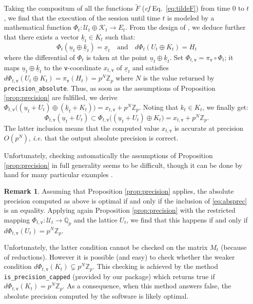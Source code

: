 \documentclass[sigconf]{acmart}
\newcommand{\Z}{\mathbb Z}
\newcommand{\Zp}{\Z_p}
\newcommand{\Q}{\mathbb Q}
\newcommand{\Qp}{\Q_p}
\newcommand{\ttv}{\texttt{v}\xspace}
\newcommand{\calU}{\mathcal{U}}
\newcommand{\calK}{\mathcal{K}}
\newcommand{\ZpLC}{\text{\color{output} \rm \tt ZpLC}\xspace}
\theoremstyle{definition}
\newtheorem{rmk}[theo]{Remark}
\begin{document}
Taking the compositum of all the functions $\tilde F$ (\emph{cf} 
Eq.~\eqref{eq:tildeF}) from time $0$ to $t$, we find that the execution 
of the session until time $t$ is modeled by a mathematical function
$\Phi_t : \calU_t \oplus \calK_t \to E_t$.
From the design of \ZpLC, we deduce further that there exists a 
vector $\underline k_t \in K_t$ such that:
$$\Phi_t(\underline u_t \oplus \underline k_t) = \underline x_t 
\quad \text{and} \quad
d\Phi_t (U_t \oplus K_t) = H_t$$
where the differential of $\Phi_t$ is taken at the point
$\underline u_t \oplus \underline k_t$. 
Set $\Phi_{t,\ttv} = \pi_\ttv \circ \Phi_t$; it maps 
$\underline u_t \oplus \underline k_t$ to the \ttv-coordinate 
$x_{t,\ttv}$ of $\underline x_t$ and satisfies
$d\Phi_{t,\ttv} (U_t \oplus K_t) = \pi_\ttv(H_t) = p^N \Zp$
where $N$ is the value returned by {\color{method}\verb?precision_absolute?}. Thus, 
as soon as the assumptions of Proposition \ref{prop:precision} are
fulfilled, we derive
$\Phi_{t,\ttv} \big((\underline u_t + U_t) \oplus (\underline k_t + K_t)\big) = 
x_{t,\ttv} + p^N \Zp$.
Noting that $k_t \in K_t$, we finally get:
\begin{equation}
\label{eq:absprec}
\Phi_{t,\ttv} (\underline u_t + U_t) \subset
\Phi_{t,\ttv} \big((\underline u_t + U_t) \oplus K_t\big) = 
x_{t,\ttv} + p^N \Zp.
\end{equation}
The latter inclusion means that the computed value $x_{t,\ttv}$ is
accurate at precision $O(p^N)$, \emph{i.e.} that the output absolute
precision is correct. 

Unfortunately, checking automatically the assumptions of Proposition 
\ref{prop:precision} in full generality seems to be difficult, though it 
can be done by hand for many particular examples
\cite{caruso-roe-vaccon:14a, caruso:2017, LV16}.

\begin{rmk}
Assuming that Proposition \ref{prop:precision} applies, 
the absolute precision computed as above is optimal if and only if
the inclusion of \eqref{eq:absprec} is an equality. Applying again
Proposition \ref{prop:precision}
with the restricted mapping $\Phi_{t,\ttv} : \calU_t \to \Qp$ and the
lattice $U_t$, we find that this happens if and only if
$d\Phi_{t,\ttv}(U_t) = p^N \Zp$.

Unfortunately, the latter condition cannot be checked on the matrix 
$M_t$ (because of reductions). 
However it is possible (and easy) to check whether the weaker condition 
$d\Phi_{t,\ttv}(K_t) \subsetneq p^N \Zp$. This checking is achieved by 
the method
\verb?is_precision_capped? (provided by our package) which returns true 
if $d\Phi_{t,\ttv}(K_t) = p^N \Zp$. As a consequence, when this method
answers false, the absolute precision computed by the software is
likely optimal.
\end{rmk}
\end{document}
